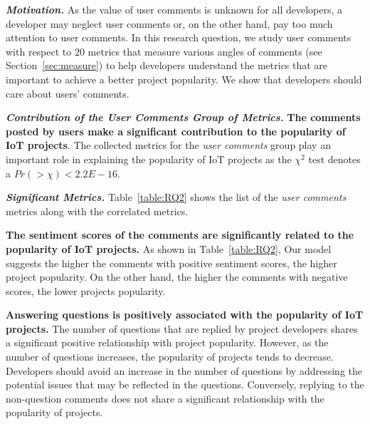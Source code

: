 

\noindent\textbf{\RQtwo}



\vspace{0.1cm}

\noindent\textbf{\textit{Motivation.}}
As the value of user comments is unknown for all developers, a developer may neglect user comments or, on the other hand, pay too much attention to user comments. In this research question, we study user comments with respect to $20$ metrics that measure various angles of comments (see Section~\ref{sec:measure}) to help developers understand the metrics that are important to achieve a better project popularity. We show that developers should care about users' comments.

\vspace{0.1cm}


\noindent\textbf{\textit{Contribution of the User Comments Group of Metrics.}} \textbf{The comments posted by users make a significant contribution to the popularity of IoT projects}. The collected metrics for the {\em user comments} group play an important role in explaining the popularity of IoT projects as the $\chi^2$ test denotes a $Pr(>\chi)<2.2E-16$.

\vspace{0.1cm}


\noindent\textbf{\textit{Significant Metrics.}} Table~\ref{table:RQ2} shows the
list of the {\em user comments} metrics along with the correlated metrics.

\textbf{The sentiment scores of the comments are significantly related to the popularity of IoT projects.} As shown in Table~\ref{table:RQ2},
Our model suggests the higher the comments with positive sentiment scores, the higher project popularity. On the other hand, the higher the comments with negative scores, the lower projects popularity.



\textbf{Answering questions is positively associated with the popularity of IoT projects.} The number of questions that are replied by project developers shares a significant positive relationship with project popularity. However, as the number of questions increases, the popularity of projects tends to
decrease.
Developers should avoid an increase in the number of questions by addressing the potential issues that may be reflected in the questions.
Conversely, replying to the non-question comments does not share a significant relationship with the popularity of projects.


